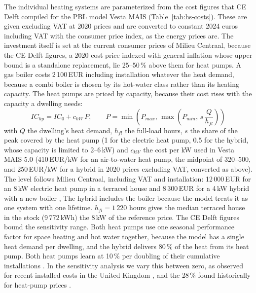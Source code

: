 \documentclass[preprint,12pt,authoryear]{elsarticle}
\begin{document}
The individual heating systems are parameterized from the cost figures that
CE Delft compiled for the PBL model Vesta MAIS
\citep{cedelftUpdateKentallenInstallaties2023} (Table~\ref{tab:hs-costs}).
These are given excluding VAT at 2020 prices and are converted to constant
2024 euros including VAT with the consumer price index, as the energy prices
are. The investment itself is set at the current consumer prices of Milieu
Centraal, because the CE Delft figures, a 2020 cost price indexed with
general inflation whose upper bound is a standalone replacement, lie
25--50\,\% above them for heat pumps. A gas boiler costs 2\,100\,EUR
including installation \citep{milieucentraalCvKetelVervangen2026} whatever
the heat demand, because a combi boiler is chosen by its hot-water class
rather than its heating capacity. The heat pumps are priced by capacity,
because their cost rises with the capacity a dwelling needs:
\begin{equation}\label{eq:ic-hp}
  IC_{hp} = IC_{0} + c_{kW}\,P, \qquad P =
  \min\!\left(P_{max},\,\max\!\left(P_{min},\,
  s\,\frac{Q}{h_{fl}}\right)\right)
\end{equation}
with $Q$ the dwelling's heat demand, $h_{fl}$ the full-load hours, $s$ the
share of the peak covered by the heat pump (1 for the electric heat pump, 0.5
for the hybrid, whose capacity is limited to 2--6\,kW) and $c_{kW}$ the cost
per kW used in Vesta MAIS 5.0 (410\,EUR/kW for an air-to-water heat pump, the
midpoint of 320--500, and 250\,EUR/kW for a hybrid in 2020 prices excluding
VAT, converted as above). The level follows Milieu Centraal, including VAT
and installation: 12\,000\,EUR for an 8\,kW electric heat pump in a terraced
house \citep{milieucentraalVolledigeWarmtepomp2026} and 8\,300\,EUR for a
4\,kW hybrid with a new boiler \citep{milieucentraalHybrideWarmtepomp2026},
The hybrid includes the boiler because the model treats it as one system with
one lifetime. $h_{fl}=1\,220$ hours gives the median terraced house in the
stock (9\,772\,kWh) the 8\,kW of the reference price. The CE Delft figures
bound the sensitivity range. Both heat pumps use one seasonal performance
factor for space heating and hot water together, because the model has a
single heat demand per dwelling, and the hybrid delivers 80\,\% of the heat
from its heat pump. Both heat pumps learn at 10\,\% per doubling of their
cumulative installations \citep{louwenREFLEXPolicyBrief2018}. In the
sensitivity analysis we vary this between zero, as observed for recent
installed costs in the United Kingdom
\citep{renaldiExperienceRatesLowcarbon2021}, and the 28\,\% found
historically for heat-pump prices \citep{weissReviewExperienceCurve2010a}.
\end{document}
